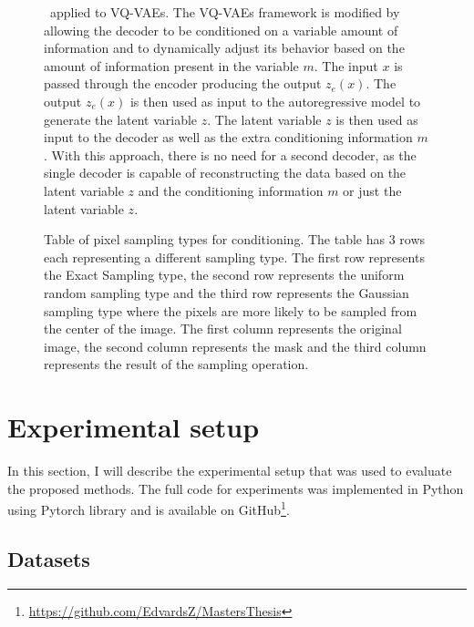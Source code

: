 \begin{figure}[H]
    \centering
    
    \caption[ applied to VQ-VAEs.]%
    {
        \methodTwo\ applied to VQ-VAEs. The VQ-VAEs framework is modified by allowing the decoder to be conditioned on a variable amount of information and to dynamically adjust its behavior based on the amount of information present in the variable $m$. The input $x$ is passed through the encoder producing the output $z_e(x)$. The output $z_e(x)$ is then used as input to the autoregressive model to generate the latent variable $z$. The latent variable $z$ is then used as input to the decoder as well as the extra conditioning information $m$. With this approach, there is no need for a second decoder, as the single decoder is capable of reconstructing the data based on the latent variable $z$ and the conditioning information $m$ or just the latent variable $z$.
    }\label{SCVQVAE1DFigure}
\end{figure}

\begin{figure}
    \centering
    
    \caption[Table of pixel sampling types for conditioning.]%
    {
        Table of pixel sampling types for conditioning. The table has 3 rows each representing a different sampling type. The first row represents the Exact Sampling type, the second row represents the uniform random sampling type and the third row represents the Gaussian sampling type where the pixels are more likely to be sampled from the center of the image. The first column represents the original image, the second column represents the mask and the third column represents the result of the sampling operation.
    }\label{SamplingFigure}
\end{figure}

\section{Experimental setup}

In this section, I will describe the experimental setup that was used to evaluate the proposed methods. The full code for experiments was implemented in Python using Pytorch library and is available on GitHub\footnote{\url{https://github.com/EdvardsZ/MastersThesis}}.

\subsection{Datasets}

